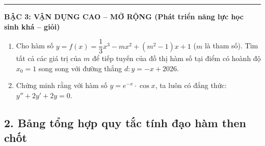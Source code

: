 \documentclass[12pt, a4paper]{article}
\begin{document}
\begin{tcolorbox}[enhanced, colback=white, colframe=blue!70!black, arc=1.5mm, title=\textbf{PHIẾU HỌC TẬP: ÔN TẬP BÀI TẬP CUỐI CHƯƠNG IX}]
\vspace{5pt}
\hrule
\vspace{5pt}

\textbf{\large BẬC 3: VẬN DỤNG CAO -- MỞ RỘNG (Phát triển năng lực học sinh khá -- giỏi)}
\begin{enumerate}[label=\textbf{Bài 3.\arabic*.}]
    \item Cho hàm số $y = f(x) = \dfrac{1}{3}x^3 - mx^2 + (m^2 - 1)x + 1$ ($m$ là tham số). Tìm tất cả các giá trị của $m$ để tiếp tuyến của đồ thị hàm số tại điểm có hoành độ $x_0 = 1$ song song với đường thẳng $d: y = -x + 2026$.
    \item Chứng minh rằng với hàm số $y = e^{-x} \cdot \cos x$, ta luôn có đẳng thức: $y'' + 2y' + 2y = 0$.
\end{enumerate}
\end{tcolorbox}

\vspace{5pt}

\subsection*{2. Bảng tổng hợp quy tắc tính đạo hàm then chốt}
\end{document}
